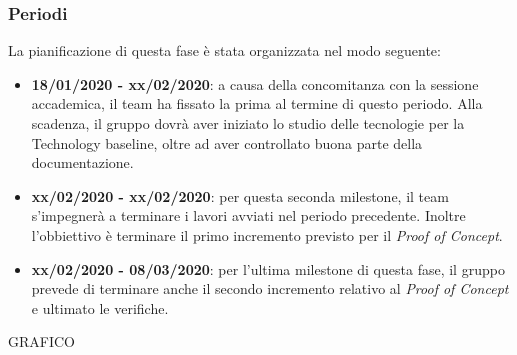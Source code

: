 \subsubsection{Periodi}
La pianificazione di questa fase è stata organizzata nel modo seguente:
\begin{itemize}
\item \textbf{18/01/2020 - xx/02/2020}: a causa della concomitanza con la sessione accademica, il team ha fissato la prima  al termine di questo periodo. Alla scadenza, il gruppo dovrà aver iniziato lo studio delle tecnologie per la Technology baseline, oltre ad aver controllato buona parte della documentazione.

\item \textbf{xx/02/2020 - xx/02/2020}: per questa seconda milestone, il team s'impegnerà a terminare i lavori avviati nel periodo precedente. Inoltre l'obbiettivo è terminare il primo incremento previsto per il \textit{Proof of Concept}.

\item \textbf{xx/02/2020 - 08/03/2020}: per l'ultima milestone di questa fase, il gruppo prevede di terminare anche il secondo incremento relativo al \textit{Proof of Concept} e ultimato le verifiche.
\end{itemize}

GRAFICO